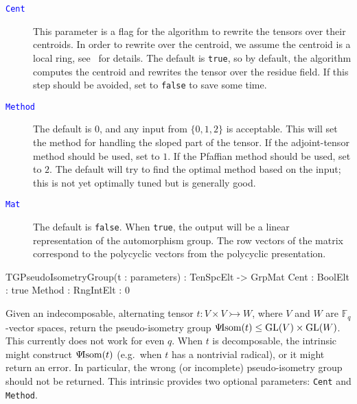 \documentclass{documentation}
\DeclareMathOperator{\isom}{Isom}
\DeclareMathOperator{\GL}{{\rm GL}}
\newcommand{\pseudo}{\Psi\hspace*{-1mm}\isom}
\begin{document}
\begin{description}
\item[\textcolor{blue}{\tt Cent}]
This parameter is a flag for the algorithm to rewrite the tensors over their centroids. In order to rewrite over the centroid, we assume the centroid is a local ring, see~\cite{TensorSpacePackage} for details. The default is \texttt{true}, so by default, the algorithm computes the centroid and rewrites the tensor over the residue field.
If this step should be avoided, set to \texttt{false} to save some time.
\item[\textcolor{blue}{\tt Method}]
The default is $0$, and any input from $\{ 0,1,2\}$ is acceptable. 
This will set the method for handling the sloped part of the tensor.
If the adjoint-tensor method should be used, set to $1$. If the Pfaffian method should be used, set to $2$. The default will try to find the optimal method based on the input; this is not yet optimally tuned but is generally good.
\item[\textcolor{blue}{\tt Mat}]
The default is \texttt{false}. When \texttt{true}, the output will be a linear representation of the automorphism group. The row vectors of the matrix correspond to the polycyclic vectors from the polycyclic presentation.
\end{description}

\begin{intrinsics}
TGPseudoIsometryGroup(t : parameters) : TenSpcElt -> GrpMat
    Cent : BoolElt : true
    Method : RngIntElt : 0
\end{intrinsics}

Given an indecomposable, alternating tensor $t : V \times V \rightarrowtail W$, where $V$ and $W$ are $\mathbb{F}_q$-vector spaces, return the pseudo-isometry group $\pseudo(t)\leq \GL(V)\times \GL(W)$.
This currently does not work for even $q$. When $t$ is decomposable, the intrinsic might construct $\pseudo(t)$ (e.g.\ when $t$ has a nontrivial radical), or it might return an error. In particular, the wrong (or incomplete) pseudo-isometry group should not be returned. 
This intrinsic provides two optional parameters: \texttt{Cent} and \texttt{Method}. 
\end{document}
